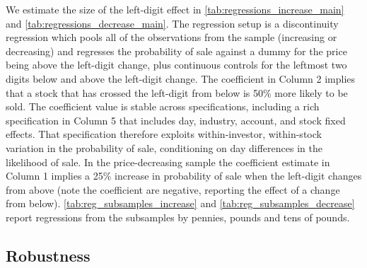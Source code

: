 We estimate the size of the left-digit effect in \ref{tab:regressions_increase_main} and \ref{tab:regressions_decrease_main}. The regression setup is a discontinuity regression which pools all of the observations from the sample (increasing or decreasing) and regresses the probability of sale against a dummy for the price being above the left-digit change, plus continuous controls for the leftmost two digits below and above the left-digit change. The coefficient in Column 2 implies that a stock that has crossed the left-digit from below is 50\% more likely to be sold. The coefficient value is stable across specifications, including a rich specification in Column 5 that includes day, industry, account, and stock fixed effects. That specification therefore exploits within-investor, within-stock variation in the probability of sale, conditioning on day differences in the likelihood of sale. In the price-decreasing sample the coefficient estimate in Column 1 implies a 25\% increase in probability of sale when the left-digit changes from above (note the coefficient are negative, reporting the effect of a change from below). \ref{tab:reg_subsamples_increase} and \ref{tab:reg_subsamples_decrease} report regressions from the subsamples by pennies, pounds and tens of pounds.

\subsection{Robustness}

